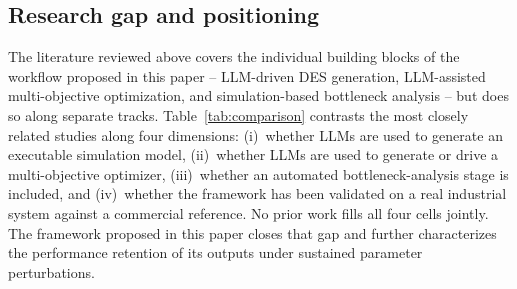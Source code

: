 \documentclass[a4paper,fleqn]{cas-sc}
\begin{document}
  
  \subsection{Research gap and positioning}\label{sec:related-gap}                                                      
            
  The literature reviewed above covers the individual building blocks of the workflow proposed in this paper --         
  LLM-driven DES generation, LLM-assisted multi-objective optimization, and simulation-based bottleneck analysis -- but
  does so along separate tracks. Table~\ref{tab:comparison} contrasts the most closely related studies along four 
  dimensions: (i)~whether LLMs are used to generate an executable simulation model, (ii)~whether LLMs are used to    
  generate or drive a multi-objective optimizer, (iii)~whether an automated bottleneck-analysis stage is included, and
  (iv)~whether the framework has been validated on a real industrial system against a commercial reference. No prior 
  work fills all four cells jointly. The framework proposed in this paper closes that gap and further characterizes the performance retention of its outputs under sustained parameter perturbations. 
\end{document}
